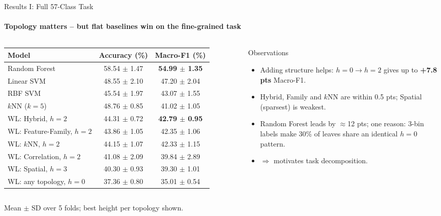 \documentclass[aspectratio=169, 11pt]{beamer}
\begin{document}
\begin{frame}{Results I: Full 57-Class Task}
    \framesubtitle{Topology matters -- but flat baselines win on the fine-grained task}
    \begin{columns}[c]
        \scriptsize
        \renewcommand{\arraystretch}{1.12}
        \begin{tabular}{@{}lcc@{}}
            \toprule
            \textbf{Model} & \textbf{Accuracy (\%)} & \textbf{Macro-F1 (\%)} \\
            \midrule
            Random Forest & 58.54 $\pm$ 1.47 & \textbf{54.99 $\pm$ 1.35} \\
            Linear SVM & 48.55 $\pm$ 2.10 & 47.20 $\pm$ 2.04 \\
            RBF SVM & 45.54 $\pm$ 1.97 & 43.07 $\pm$ 1.55 \\
            $k$NN ($k=5$) & 48.76 $\pm$ 0.85 & 41.02 $\pm$ 1.05 \\
            \midrule
            WL: Hybrid, $h=2$ & 44.31 $\pm$ 0.72 & \textbf{42.79 $\pm$ 0.95} \\
            WL: Feature-Family, $h=2$ & 43.86 $\pm$ 1.05 & 42.35 $\pm$ 1.06 \\
            WL: $k$NN, $h=2$ & 44.15 $\pm$ 1.07 & 42.33 $\pm$ 1.15 \\
            WL: Correlation, $h=2$ & 41.08 $\pm$ 2.09 & 39.84 $\pm$ 2.89 \\
            WL: Spatial, $h=3$ & 40.30 $\pm$ 0.93 & 39.30 $\pm$ 1.01 \\
            WL: any topology, $h=0$ & 37.36 $\pm$ 0.80 & 35.01 $\pm$ 0.54 \\
            \bottomrule
        \end{tabular}

        \begin{block}{Observations}
            \scriptsize
            \begin{itemize}
                \item Adding structure helps: $h=0 \rightarrow h=2$ gives up to \textbf{+7.8 pts} Macro-F1.
                \item Hybrid, Family and $k$NN are within 0.5 pts; Spatial (sparsest) is weakest.
                \item Random Forest leads by $\approx$12 pts; one reason: 3-bin labels make 30\% of leaves share an identical $h=0$ pattern.
                \item $\Rightarrow$ motivates task decomposition.
            \end{itemize}
        \end{block}
    \end{columns}
    \vspace{0.05cm}
    {\tiny Mean $\pm$ SD over 5 folds; best height per topology shown.}
\end{frame}
\end{document}
